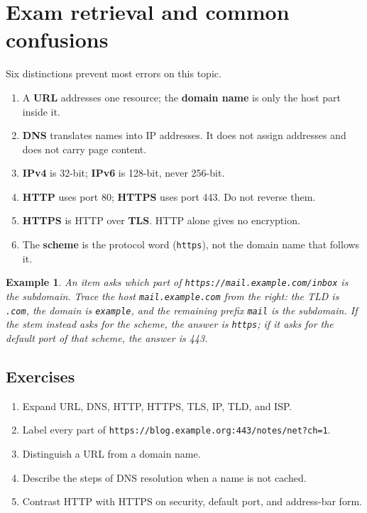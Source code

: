 \documentclass[11pt]{article}
\newtheorem{example}{Example}[section]
\begin{document}
\section{Exam retrieval and common confusions}
Six distinctions prevent most errors on this topic.
\begin{enumerate}
  \item A \textbf{URL} addresses one resource; the \textbf{domain name} is
    only the host part inside it.
  \item \textbf{DNS} translates names into IP addresses. It does not assign
    addresses and does not carry page content.
  \item \textbf{IPv4} is 32-bit; \textbf{IPv6} is 128-bit, never 256-bit.
  \item \textbf{HTTP} uses port 80; \textbf{HTTPS} uses port 443. Do not
    reverse them.
  \item \textbf{HTTPS} is HTTP over \textbf{TLS}. HTTP alone gives no
    encryption.
  \item The \textbf{scheme} is the protocol word (\texttt{https}), not the
    domain name that follows it.
\end{enumerate}

\begin{example}
An item asks which part of \texttt{https://mail.example.com/inbox} is the
subdomain. Trace the host \texttt{mail.example.com} from the right: the TLD
is \texttt{.com}, the domain is \texttt{example}, and the remaining prefix
\texttt{mail} is the subdomain. If the stem instead asks for the scheme,
the answer is \texttt{https}; if it asks for the default port of that
scheme, the answer is 443.
\end{example}

\subsection*{Exercises}
\begin{enumerate}[label=\arabic*.]
  \item Expand URL, DNS, HTTP, HTTPS, TLS, IP, TLD, and ISP.
  \item Label every part of \texttt{https://blog.example.org:443/notes/net?ch=1}.
  \item Distinguish a URL from a domain name.
  \item Describe the steps of DNS resolution when a name is not cached.
  \item Contrast HTTP with HTTPS on security, default port, and address-bar
    form.
\end{enumerate}
\end{document}
